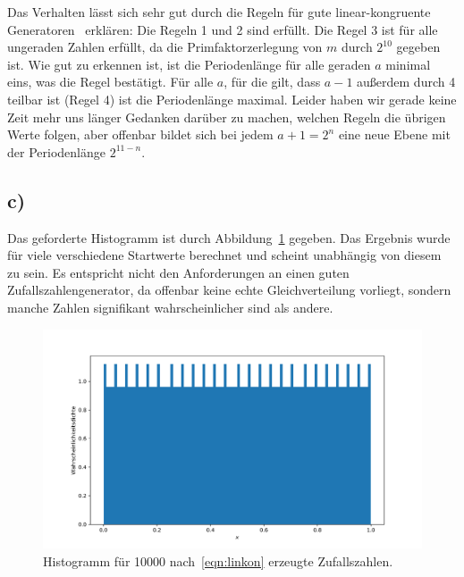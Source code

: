 \documentclass[a4paper, 11pt]{article}
\begin{document}
Das Verhalten lässt sich sehr gut durch die Regeln für gute linear-kongruente Generatoren~\cite[S.~7]{skript} erklären: Die Regeln 1 und 2 sind erfüllt. Die Regel 3 ist für alle ungeraden Zahlen erfüllt, da die Primfaktorzerlegung von $m$ durch $2^{10}$ gegeben ist. Wie gut zu erkennen ist, ist die Periodenlänge für alle geraden $a$ minimal eins, was die Regel bestätigt. Für alle $a$, für die gilt, dass $a-1$ außerdem durch 4 teilbar ist (Regel 4) ist die Periodenlänge maximal. Leider haben wir gerade keine Zeit mehr uns länger Gedanken darüber zu machen, welchen Regeln die übrigen Werte folgen, aber offenbar bildet sich bei jedem $a+1 = 2^{n}$ eine neue Ebene mit der Periodenlänge $2^{11 - n}$.
\FloatBarrier

\subsection*{c)}
Das geforderte Histogramm ist durch Abbildung~\ref{fig:a9c} gegeben. Das Ergebnis wurde für viele verschiedene Startwerte berechnet und scheint unabhängig von diesem zu sein. Es entspricht nicht den Anforderungen an einen guten Zufallszahlengenerator, da offenbar keine echte Gleichverteilung vorliegt, sondern manche Zahlen signifikant wahrscheinlicher sind als andere.
\begin{figure}
    \centering
    \includegraphics[width=\textwidth]{../A09/A9c.png}
    \caption{Histogramm für 10000 nach~\ref{eqn:linkon} erzeugte Zufallszahlen. }
    \label{fig:a9c}
\end{figure}
\FloatBarrier
\end{document}
